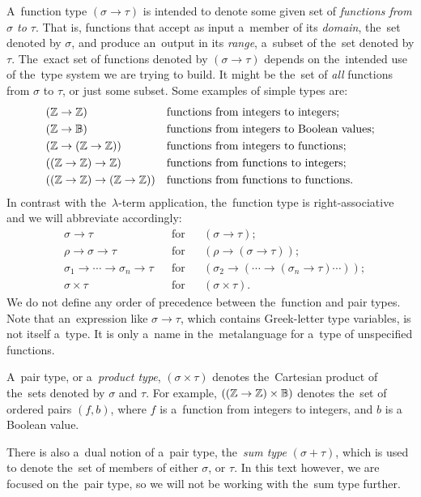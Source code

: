 A~function type $(\sigma \to \tau)$ is intended to denote some given set of
\emph{functions from $\sigma$ to $\tau$}. That is, functions that accept as
input a~member of its \emph{domain}, the~set denoted by $\sigma$, and produce
an~output in its \emph{range}, a~subset of the~set denoted by $\tau$. The~exact
set of functions denoted by $(\sigma \to \tau)$ depends on the~intended use
of the~type system we are trying to build. It might be the~set of \emph{all}
functions from $\sigma$ to $\tau$, or just some subset. Some examples of simple
types are:
\begin{align*}
  &(\mathbb{Z} \to \mathbb{Z}) && \text{functions from integers to integers;} \\
  &(\mathbb{Z} \to \mathbb{B}) && \text{functions from integers to Boolean values;} \\
  &(\mathbb{Z} \to (\mathbb{Z} \to \mathbb{Z})) && \text{functions from integers to functions;} \\
  &((\mathbb{Z} \to \mathbb{Z}) \to \mathbb{Z}) && \text{functions from functions to integers;} \\
  &((\mathbb{Z} \to \mathbb{Z}) \to (\mathbb{Z} \to \mathbb{Z})) && \text{functions from functions to
    functions.}
\end{align*}
In contrast with the~$\lambda$-term application, the~function type is
right-associative and we will abbreviate accordingly:
\begin{align*}
  &\sigma \to \tau  &  &\text{for} &  &(\sigma \to \tau); \\
  &\rho \to \sigma \to \tau  &  &\text{for} &  &(\rho \to (\sigma \to \tau)); \\
  &\sigma_1 \to \dotsb \to \sigma_n \to \tau  &  &\text{for} &  
    &(\sigma_2 \to ( \dotsb \to (\sigma_n \to \tau) \dotsb )); \\
  &\sigma \times \tau  &  &\text{for} &  &(\sigma \times \tau).
\end{align*}
We do not define any order of precedence between the~function and pair types.
Note that an~expression like $\sigma \to \tau$, which contains Greek-letter type
variables, is not itself a~type. It is only a~name in the~metalanguage for
a~type of unspecified functions.

A~pair type, or a~\emph{product type}, $(\sigma \times \tau)$ denotes
the~Cartesian product of the~sets denoted by $\sigma$ and $\tau$. For example,
$((\mathbb{Z} \to \mathbb{Z}) \times \mathbb{B})$ denotes the~set of ordered pairs $(f, b)$,
where $f$ is a~function from integers to integers, and $b$ is a Boolean value.

There is also a~dual notion of a~pair type, the~\emph{sum type} $(\sigma +
\tau)$, which is used to denote the~set of members of either $\sigma$, or
$\tau$. In this text however, we are focused on the~pair type, so we will not be
working with the~sum type further.

